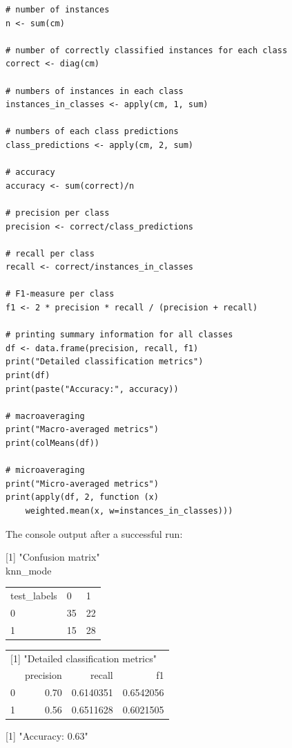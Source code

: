 \begin{verbatim}
# number of instances
n <- sum(cm)

# number of correctly classified instances for each class
correct <- diag(cm)

# numbers of instances in each class
instances_in_classes <- apply(cm, 1, sum)

# numbers of each class predictions
class_predictions <- apply(cm, 2, sum)

# accuracy
accuracy <- sum(correct)/n

# precision per class
precision <- correct/class_predictions

# recall per class
recall <- correct/instances_in_classes

# F1-measure per class
f1 <- 2 * precision * recall / (precision + recall)

# printing summary information for all classes
df <- data.frame(precision, recall, f1)
print("Detailed classification metrics")
print(df)
print(paste("Accuracy:", accuracy))

# macroaveraging
print("Macro-averaged metrics")
print(colMeans(df))

# microaveraging
print("Micro-averaged metrics")
print(apply(df, 2, function (x)
    weighted.mean(x, w=instances_in_classes)))
\end{verbatim}

The console output after a successful run:

\hspace{-0.3cm}[1] "Confusion matrix" \\

\hspace{2cm}knn\_mode

\begin{flushleft}
\begin{tabular}{lll}
test\_labels & 0 & 1 \\
0 & 35 & 22 \\
1 & 15 & 28 \\
\end{tabular}
\end{flushleft}

\begin{flushleft}
\begin{tabular}{rrrr}
\multicolumn{4}{l}{[1] "Detailed classification metrics"} \\
 & precision & recall & f1 \\
0 & 0.70 & 0.6140351 & 0.6542056 \\
1 & 0.56 & 0.6511628 & 0.6021505 \\
\end{tabular}
\end{flushleft}
\hspace{0.3cm}[1] "Accuracy: 0.63"\\[0pt]


